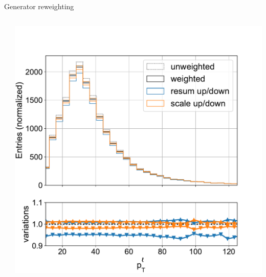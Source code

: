 \begin{frame}{Generator reweighting}
\begin{columns}
\begin{block}{\PZ \pt}
        \end{block}
        \begin{block}{\WW \pt}
            \includegraphics[width=\textwidth]{chapters/Analysis/sectionCalibration/figures/generator/ww_pt_lepton_pt.pdf}
        \end{block}
            
    \end{columns}
\end{frame}


